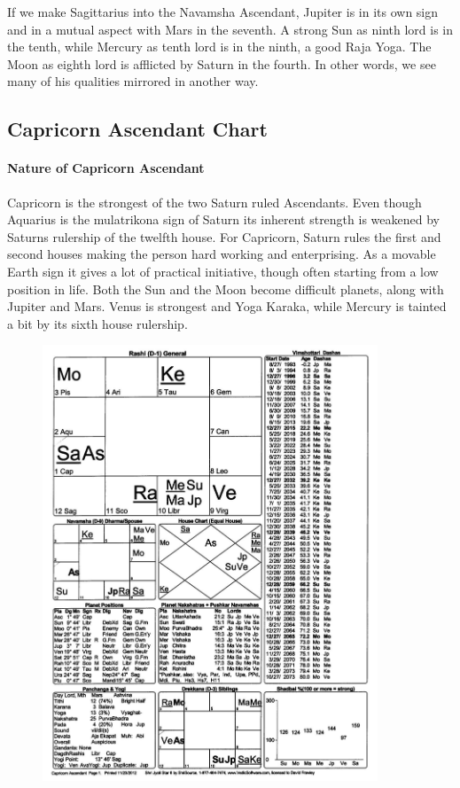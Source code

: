  

If we make Sagittarius into the Navamsha Ascendant, Jupiter is in its own sign and in a mutual aspect with Mars in the seventh. A strong Sun as ninth lord is in the tenth, while Mercury as tenth lord is in the ninth, a good Raja Yoga. The Moon as eighth lord is afflicted by Saturn in the fourth. In other words, we see many of his qualities mirrored in another way.

 

\subsection{Capricorn Ascendant Chart}

\paragraph{Nature of Capricorn Ascendant}
 

Capricorn is the strongest of the two Saturn ruled Ascendants. Even though Aquarius is the mulatrikona sign of Saturn its inherent strength is weakened by Saturns rulership of the twelfth house. For Capricorn, Saturn rules the first and second houses making the person hard working and enterprising. As a movable Earth sign it gives a lot of practical initiative, though often starting from a low position in life. Both the Sun and the Moon become difficult planets, along with Jupiter and Mars. Venus is strongest and Yoga Karaka, while Mercury is tainted a bit by its sixth house rulership.

 

\begin{figure}[h]
\centering
\includegraphics[width=10cm]{pics/Capricorn-Ascendant.jpg}
\caption{}
\end{figure}
 

